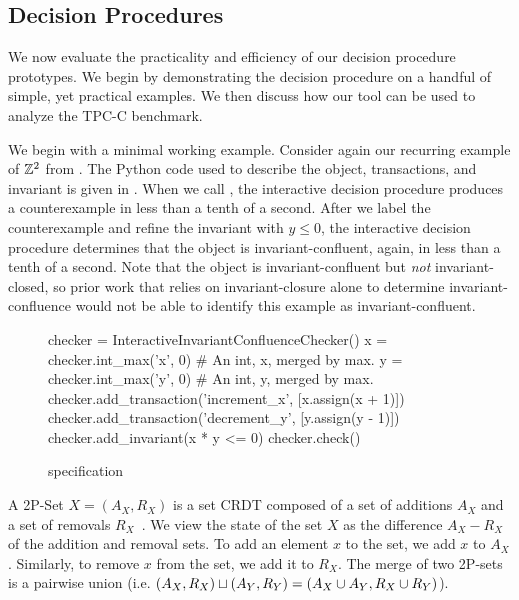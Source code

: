 \subsection{Decision Procedures}
We now evaluate the practicality and efficiency of our decision procedure
prototypes. We begin by demonstrating the decision procedure on a handful of
simple, yet practical examples. We then discuss how our tool can be used to
analyze the TPC-C benchmark.

\example[$\ints^2$]
We begin with a minimal working example. Consider again our recurring example
of $\ints^2$ from . The Python code used to describe the object,
transactions, and invariant is given in . When we call
, the interactive decision procedure produces a
counterexample in less than a tenth of a second.  After we label the
counterexample and refine the invariant with $y \leq 0$, the interactive
decision procedure determines that the object is invariant-confluent, again, in
less than a tenth of a second. Note that the object is invariant-confluent but
\emph{not} invariant-closed, so prior work that relies on invariant-closure
alone to determine invariant-confluence would not be able to identify this
example as invariant-confluent.

\begin{figure}[ht]
  \begin{Python}[gobble=4]
    checker = InteractiveInvariantConfluenceChecker()
    x = checker.int_max('x', 0) # An int, x, merged by max.
    y = checker.int_max('y', 0) # An int, y, merged by max.
    checker.add_transaction('increment_x', [x.assign(x + 1)])
    checker.add_transaction('decrement_y', [y.assign(y - 1)])
    checker.add_invariant(x * y <= 0)
    checker.check()
  \end{Python}
  \caption{ specification}
\end{figure}

A 2P-Set $X = (A_X, R_X)$ is a set CRDT composed of a set of additions $A_X$
and a set of removals $R_X$~\cite{shapiro2011comprehensive}. We view the state
of the set $X$ as the difference $A_X - R_X$ of the addition and removal sets.
To add an element $x$ to the set, we add $x$ to $A_X$. Similarly, to remove $x$
from the set, we add it to $R_X$. The merge of two 2P-sets is a pairwise union
(i.e. $(A_X, R_X) \sqcup (A_Y, R_Y) = (A_X \cup A_Y, R_X \cup R_Y)$).

